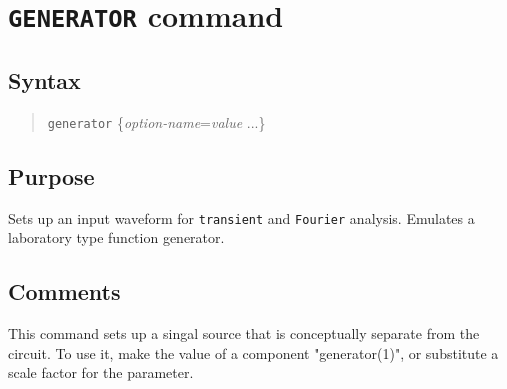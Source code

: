 %
%
%
%
\section{{\tt GENERATOR} command}
\subsection{Syntax}
\begin{verse}
{\tt generator} \{{\it option-name}={\it value} ...\}
\end{verse}
\subsection{Purpose}

Sets up an input waveform for {\tt transient} and {\tt Fourier} analysis.
Emulates a laboratory type function generator.
\subsection{Comments}

This command sets up a singal source that is conceptually separate
from the circuit.  To use it, make the value of a component
"generator(1)", or substitute a scale factor for the parameter.

